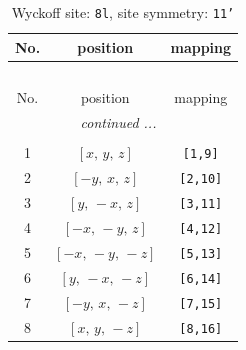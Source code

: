 \documentclass[fleqn,8pt]{jsarticle}
\begin{document}
\renewcommand{\arraystretch}{1.2}
\begin{longtable}{ccc}
\caption{Wyckoff site: {\tt 8l}, site symmetry: {\tt 11'}}
 \\
 \hline \hline
No. & position & mapping \\ \hline \endfirsthead

\multicolumn{2}{l}{\tablename\ \thetable{}} \\
 \hline \hline
No. & position & mapping \\ \hline \endhead

 \hline \hline
\multicolumn{2}{r}{\footnotesize\it continued ...} \\ \endfoot

 \hline \hline
\multicolumn{2}{r}{} \\ \endlastfoot

1 & $\left[ x,\, y,\, z \right]$ & {\tt [1,9]} \\ \hline
2 & $\left[ - y,\, x,\, z \right]$ & {\tt [2,10]} \\ \hline
3 & $\left[ y,\, - x,\, z \right]$ & {\tt [3,11]} \\ \hline
4 & $\left[ - x,\, - y,\, z \right]$ & {\tt [4,12]} \\ \hline
5 & $\left[ - x,\, - y,\, - z \right]$ & {\tt [5,13]} \\ \hline
6 & $\left[ y,\, - x,\, - z \right]$ & {\tt [6,14]} \\ \hline
7 & $\left[ - y,\, x,\, - z \right]$ & {\tt [7,15]} \\ \hline
8 & $\left[ x,\, y,\, - z \right]$ & {\tt [8,16]} \\
\end{longtable}
\end{document}

